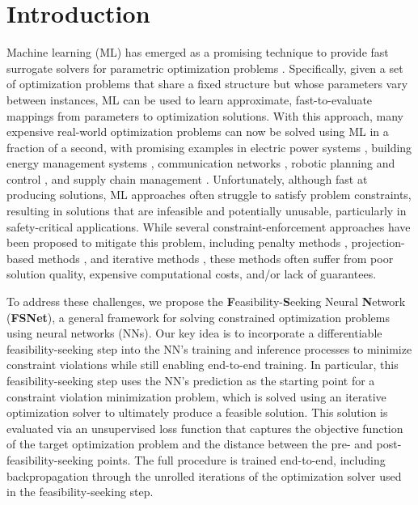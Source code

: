 \documentclass{article}
\newcommand{\revise}[1]{{\color{blue} #1}}
\begin{document}
\section{Introduction}
Machine learning (ML) has emerged as a promising technique to provide fast surrogate solvers for parametric optimization problems \cite{van2025optimization, amos2023tutorial}.
Specifically, given a set of optimization problems 
that share a fixed structure 
but whose parameters vary between instances, ML can be used to learn approximate, fast-to-evaluate mappings from parameters to optimization solutions.
With this approach, many expensive real-world optimization problems can now be solved using ML
in a fraction of a second, with promising examples in electric power systems \cite{park2023compact, khaloie2025review}, building energy management systems \cite{drgovna2021physics}, communication networks \cite{hu2021reconfigurable}, robotic planning and control \cite{wu2024deep, cauligi2020learning}, and supply chain management \cite{akhlaghi2025propel}.
Unfortunately, although fast at producing solutions, ML approaches often struggle to satisfy problem constraints, resulting in solutions that are infeasible and potentially unusable, particularly in safety-critical applications.
While several constraint-enforcement approaches have been proposed to mitigate this problem, including penalty methods \cite{fioretto2021lagrangian}, projection-based methods \cite{min2024hard, huang2021differentiable}, and iterative methods \cite{donti2021dc3, lastrucci2025enforce}, these methods often suffer from poor solution quality, expensive computational costs, and/or lack of guarantees.

To address these challenges, we propose the \textbf{F}easibility-\textbf{S}eeking Neural \textbf{N}etwork (\textbf{FSNet}), a general framework for solving constrained optimization problems using neural networks (NNs). 
Our key idea is to incorporate a differentiable feasibility-seeking step into the NN's training and inference processes to minimize constraint violations while still enabling end-to-end training.
In particular, this feasibility-seeking step uses the NN's prediction as the starting point for a constraint violation minimization problem, which is solved using an iterative optimization solver to ultimately produce
a feasible solution. 
This solution is evaluated via an unsupervised loss function that captures the objective function of the target optimization problem and the distance between the pre- and post-feasibility-seeking points.
The full procedure is trained end-to-end, including backpropagation through the unrolled iterations of the optimization solver used in the feasibility-seeking step.
\end{document}
